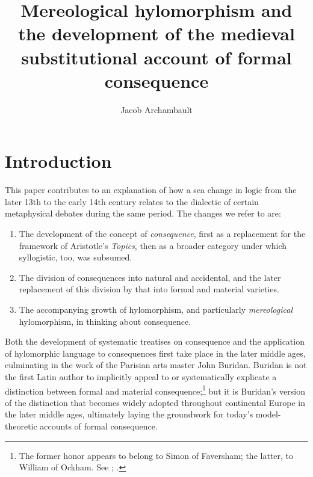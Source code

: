 \documentclass[]{article}
\title{Mereological hylomorphism and the development of the medieval substitutional account of formal consequence}
\author{Jacob Archambault}
\begin{document}
\maketitle

\section{Introduction}
This paper contributes to an explanation of how a sea change in logic from the later 13th to the early 14th century relates to the dialectic of certain metaphysical debates during the same period. The changes we refer to are:
\begin{enumerate}
	\item The development of the concept of \textit{consequence}, first as a replacement for the framework of Aristotle's \textit{Topics}, then as a broader category under which syllogistic, too, was subsumed. 
	\item The division of consequences into natural and accidental, and the later replacement of this division by that into formal and material varieties.
	\item The accompanying growth of hylomorphism, and particularly \textit{mereological} hylomorphism, in thinking about consequence.
\end{enumerate}

Both the development of systematic treatises on consequence and the application of hylomorphic language to consequences first take place in the later middle ages, culminating in the work of the Parisian arts master John Buridan. Buridan is not the first Latin author to implicitly appeal to or systematically explicate a distinction between formal and material consequence;\footnote{The former honor appears to belong to Simon of Faversham; the latter, to William of Ockham. See \autocite[q. 36]{FavershamQE}; \autocite[III-3. 1, p. 589]{OckhamSL}.} but it is Buridan's version of the distinction that becomes widely adopted throughout continental Europe in the later middle ages, ultimately laying the groundwork for today's model-theoretic accounts of formal consequence.
\end{document}
